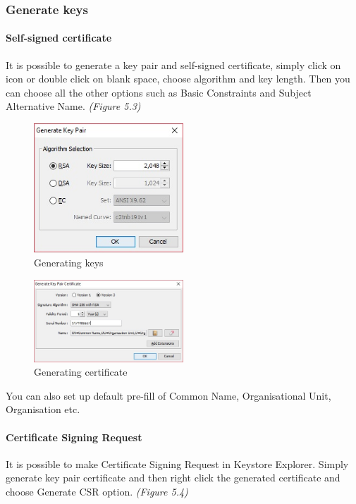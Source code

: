 \documentclass[10pt, a4paper]{report}
\begin{document}
{    \subsubsection{Generate keys}
    
      \paragraph{Self-signed certificate}
It is possible to generate a key pair and self-signed certificate, simply click on icon or double click on blank space, choose algorithm and key length. Then you can choose all the other options such as Basic Constraints and Subject Alternative Name. \textit{(Figure 5.3)}

\begin{figure}[!ht]
 \caption{Generating keys}
 \centering
  \includegraphics[width=0.5\textwidth]{../Dependancies/Keystore_Explorer/genKeys.jpg}
\end{figure}

\begin{figure}[!ht]
 \caption{Generating certificate}
 \centering
  \includegraphics[width=0.5\textwidth]{../Dependancies/Keystore_Explorer/genCert.jpg}
\end{figure}

You can also set up default pre-fill of Common Name, Organisational Unit, Organisation etc.

      \paragraph{Certificate Signing Request}
It is possible to make Certificate Signing Request in Keystore Explorer. Simply generate key pair certificate and then right click the generated certificate and choose Generate CSR option. \textit{(Figure 5.4)}

}
\end{document}

